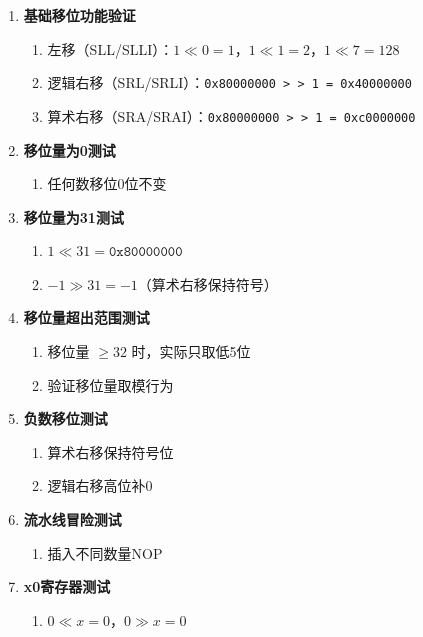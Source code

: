 \documentclass[12pt,a4paper]{ctexart}
\begin{document}
\begin{enumerate}
    \item \textbf{基础移位功能验证}
    \begin{enumerate}
        \item 左移（SLL/SLLI）：$1 \ll 0 = 1$，$1 \ll 1 = 2$，$1 \ll 7 = 128$
        \item 逻辑右移（SRL/SRLI）：\texttt{0x80000000 > > 1 = 0x40000000}
        \item 算术右移（SRA/SRAI）：\texttt{0x80000000 > > 1 = 0xc0000000}
    \end{enumerate}
    
    \item \textbf{移位量为0测试}
    \begin{enumerate}
        \item 任何数移位0位不变
    \end{enumerate}
    
    \item \textbf{移位量为31测试}
    \begin{enumerate}
        \item $1 \ll 31 = \texttt{0x80000000}$
        \item $-1 \gg 31 = -1$（算术右移保持符号）
    \end{enumerate}
    
    \item \textbf{移位量超出范围测试}
    \begin{enumerate}
        \item 移位量 $\ge 32$ 时，实际只取低5位
        \item 验证移位量取模行为
    \end{enumerate}
    
    \item \textbf{负数移位测试}
    \begin{enumerate}
        \item 算术右移保持符号位
        \item 逻辑右移高位补0
    \end{enumerate}
    
    \item \textbf{流水线冒险测试}
    \begin{enumerate}
        \item 插入不同数量NOP
    \end{enumerate}
    
    \item \textbf{x0寄存器测试}
    \begin{enumerate}
        \item $0 \ll x = 0$，$0 \gg x = 0$
    \end{enumerate}
\end{enumerate}
\end{document}
